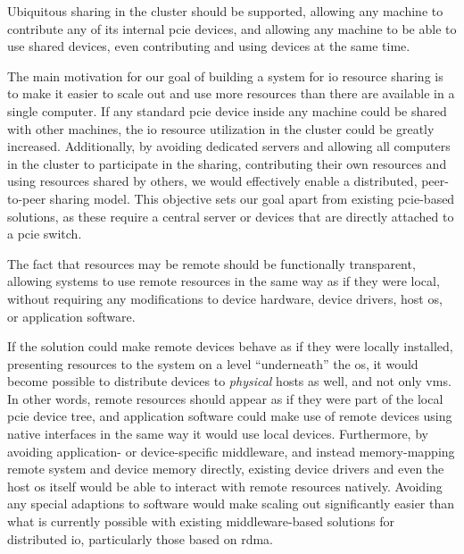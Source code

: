 \begin{objective}\label{obj:distributed}
    Ubiquitous sharing in the cluster should be supported, allowing any machine to contribute any of its internal \gls{pcie} devices, and allowing any machine to be able to use shared devices, even contributing and using devices at the same time.
\end{objective}
The main motivation for our goal of building a system for \gls{io} resource sharing is to make it easier to scale out and use more resources than there are available in a single computer. 
If any standard \gls{pcie} device inside any machine could be shared with other machines, the \gls{io} resource utilization in the cluster could be greatly increased.
Additionally, by avoiding dedicated servers and allowing all computers in the cluster to participate in the sharing, contributing their own resources and using resources shared by others, we would effectively enable a distributed, peer-to-peer sharing model. 
This objective sets our goal apart from existing \gls{pcie}-based solutions, as these require a central server or devices that are directly attached to a \gls{pcie} switch.



\begin{objective}\label{obj:transparent}
    The fact that resources may be remote should be functionally transparent, allowing systems to use remote resources in the same way as if they were local, without requiring any modifications to device hardware, device drivers, host \gls{os}, or application software.
\end{objective}
If the solution could make remote devices behave as if they were locally installed, presenting resources to the system on a level ``underneath'' the \gls{os}, it would become possible to distribute devices to \emph{physical} hosts as well, and not only \glspl{vm}. 
In other words, remote resources should appear as if they were part of the local \gls{pcie} device tree, and application software could make use of remote devices using native interfaces in the same way it would use local devices.
%
Furthermore, by avoiding application- or device-specific \gls{middleware}, and instead memory-mapping remote system and device memory directly, existing device drivers and even the host \gls{os} itself would be able to interact with remote resources natively.
Avoiding any special adaptions to software would make scaling out significantly easier than what is currently possible with existing \gls{middleware}-based solutions for distributed \gls{io}, particularly those based on \gls{rdma}.



